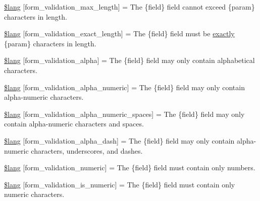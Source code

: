\begin{DoxyCompactItemize}
\item 
\mbox{\hyperlink{form__validation__lang_8php_acb1f5fa772e61a5ee9c619744b2e8b4d}{\$lang}} \mbox{[}\textquotesingle{}form\+\_\+validation\+\_\+max\+\_\+length\textquotesingle{}\mbox{]} = \textquotesingle{}The \{field\} field cannot exceed \{param\} characters in length.\textquotesingle{}
\item 
\mbox{\hyperlink{form__validation__lang_8php_af3bc1553bbee67384ccabfb19f901a0a}{\$lang}} \mbox{[}\textquotesingle{}form\+\_\+validation\+\_\+exact\+\_\+length\textquotesingle{}\mbox{]} = \textquotesingle{}The \{field\} field must be \mbox{\hyperlink{_functions_8php_ae7c3745d729abab68ef3f3e783b944cf}{exactly}} \{param\} characters in length.\textquotesingle{}
\item 
\mbox{\hyperlink{form__validation__lang_8php_ae29211484726ff85b1243d8736664db4}{\$lang}} \mbox{[}\textquotesingle{}form\+\_\+validation\+\_\+alpha\textquotesingle{}\mbox{]} = \textquotesingle{}The \{field\} field may only contain alphabetical characters.\textquotesingle{}
\item 
\mbox{\hyperlink{form__validation__lang_8php_a868f2756e3f0886b6b35cb879878be17}{\$lang}} \mbox{[}\textquotesingle{}form\+\_\+validation\+\_\+alpha\+\_\+numeric\textquotesingle{}\mbox{]} = \textquotesingle{}The \{field\} field may only contain alpha-\/numeric characters.\textquotesingle{}
\item 
\mbox{\hyperlink{form__validation__lang_8php_ae6c93d16569d49fd9e9bda81a1dc46e6}{\$lang}} \mbox{[}\textquotesingle{}form\+\_\+validation\+\_\+alpha\+\_\+numeric\+\_\+spaces\textquotesingle{}\mbox{]} = \textquotesingle{}The \{field\} field may only contain alpha-\/numeric characters and spaces.\textquotesingle{}
\item 
\mbox{\hyperlink{form__validation__lang_8php_a65e5c17cc79ed4481910f1d26f684957}{\$lang}} \mbox{[}\textquotesingle{}form\+\_\+validation\+\_\+alpha\+\_\+dash\textquotesingle{}\mbox{]} = \textquotesingle{}The \{field\} field may only contain alpha-\/numeric characters, underscores, and dashes.\textquotesingle{}
\item 
\mbox{\hyperlink{form__validation__lang_8php_aae9865438558fdb469fd952f683f29c4}{\$lang}} \mbox{[}\textquotesingle{}form\+\_\+validation\+\_\+numeric\textquotesingle{}\mbox{]} = \textquotesingle{}The \{field\} field must contain only numbers.\textquotesingle{}
\item 
\mbox{\hyperlink{form__validation__lang_8php_a91d65bc40a96da1fb551ab491da779fc}{\$lang}} \mbox{[}\textquotesingle{}form\+\_\+validation\+\_\+is\+\_\+numeric\textquotesingle{}\mbox{]} = \textquotesingle{}The \{field\} field must contain only numeric characters.\textquotesingle{}

\end{DoxyCompactItemize}
